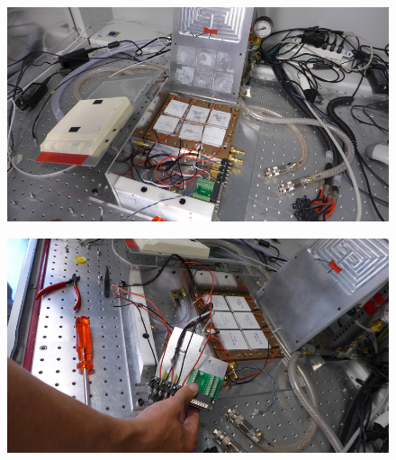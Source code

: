 \documentclass[a4paper,12pt,twoside]{article}
\begin{document}
\begin{appendices}
\begin{figure} [h!]
\centering
\begin{minipage}{.48\textwidth}
  \centering
  \includegraphics[width=\textwidth]{./Point6.png}
  \label{Step6}
\end{minipage}%
\hspace{2mm}
\begin{minipage}{.48\textwidth}
  \centering
  \includegraphics[width=\textwidth]{./Point7.png}
  \label{Step7}
\end{minipage}
\end{figure}


\end{appendices}
\end{document}
